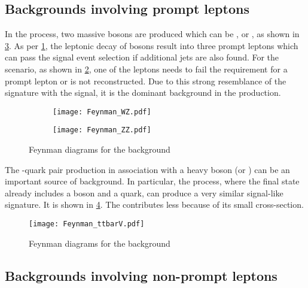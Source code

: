 \subsection*{Backgrounds involving prompt leptons}

In the \diboson process, two massive bosons are produced which can be \PZ{}\PZ, \PW{}\PW or \PW{}\PZ,
as shown in \cref{fig:VVfeyn}. As per \cref{fig:VVfeyna}, the leptonic decay of bosons result 
into three prompt leptons which can pass the signal event selection if additional jets are also found.
For the \PZ{}\PZ scenario, as shown in \cref{fig:VVfeynb}, one of the leptons needs to fail the 
requirement for a prompt lepton or is not reconstructed. Due to this strong resemblance of the 
\diboson signature with the signal, it is the dominant background in the \tZq production. 

\begin{figure}[htbp]
  \centering
  \begin{subfigure}{0.45\figwidth}
    \centering
    \texttt{[image: Feynman\_WZ.pdf]}
    \caption{}
    \label{fig:VVfeyna}
  \end{subfigure}
  \begin{subfigure}{0.45\figwidth}
    \centering
    \texttt{[image: Feynman\_ZZ.pdf]}
    \caption{}
    \label{fig:VVfeynb}
  \end{subfigure}
  \caption[Feynman diagrams for \diboson backgrounds]{Feynman diagrams for the \diboson background}
  \label{fig:VVfeyn}
  \end{figure}

The \Ptop-quark pair production in association with a heavy boson (\PZ or \PW) can be an
important source of background. In particular, the \ttZ process, where the 
final state already includes a \PZ boson and a \Ptop quark, can produce a very 
similar signal-like signature. It is shown in \cref{fig:ttZ}. The \ttH contributes
less because of its small cross-section.

\begin{figure}
  \centering
      \texttt{[image: Feynman\_ttbarV.pdf]}
      \caption{Feynman diagrams for the \ttZ background}
         \label{fig:ttZ}
\end{figure}

\subsection*{Backgrounds involving non-prompt leptons}

